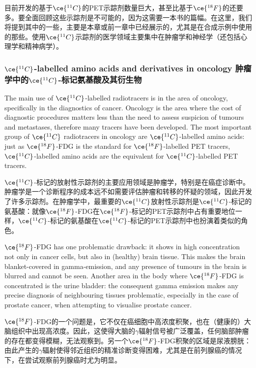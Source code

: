 \documentclass[dvipsnames, svgnames,a4paper,11pt]{article}
\begin{document}
目前开发的基于\(\ce{^{11}C}\)的PET示踪剂数量巨大，甚至比基于\(\ce{^{18}F}\)的还要多。要全面回顾这些示踪剂是不可能的，因为这需要一本书的篇幅。在这里，我们将提到其中的一些，主要是本章或前一章中已经展示的，尤其是在合成示例中使用的那些。使用\(\ce{^{11}C}\)示踪剂的医学领域主要集中在肿瘤学和神经学（还包括心理学和精神病学）。


\subsubsection{\(\ce{^{11}C}\)-labelled amino acids and derivatives in oncology 肿瘤学中的\(\ce{^{11}C}\)-标记氨基酸及其衍生物}  
The main use of \(\ce{^{11}C}\)-labelled radiotracers is in the area of oncology, specifically in the diagnostics of cancer. Oncology is the area where the cost of diagnostic procedures matters less than the need to assess suspicion of tumours and metastases, therefore many tracers have been developed. The most important group of \(\ce{^{11}C}\) radiotracers in oncology are \(\ce{^{11}C}\)-labelled amino acids: just as \(\ce{^{18}F}\)-FDG is the standard for \(\ce{^{18}F}\)-labelled PET tracers, \(\ce{^{11}C}\)-labelled amino acids are the equivalent for \(\ce{^{11}C}\)-labelled PET tracers.

\(\ce{^{11}C}\)-标记的放射性示踪剂的主要应用领域是肿瘤学，特别是在癌症诊断中。肿瘤学是一个诊断程序的成本远不如需要评估肿瘤和转移的怀疑的领域，因此开发了许多示踪剂。在肿瘤学中，最重要的\(\ce{^{11}C}\)放射性示踪剂是\(\ce{^{11}C}\)-标记的氨基酸：就像\(\ce{^{18}F}\)-FDG在\(\ce{^{18}F}\)-标记的PET示踪剂中占有重要地位一样，\(\ce{^{11}C}\)-标记的氨基酸在\(\ce{^{11}C}\)-标记的PET示踪剂中也扮演着类似的角色。

\(\ce{^{18}F}\)-FDG has one problematic drawback: it shows in high concentration not only in cancer cells, but also in (healthy) brain tissue. This makes the brain blanket-covered in gamma-emission, and any presence of tumours in the brain is blurred and cannot be seen. Another area in the body where \(\ce{^{18}F}\)-FDG is concentrated is the urine bladder: the consequent gamma emission makes any precise diagnosis of neighbouring tissues problematic, especially in the case of prostate cancer, when attempting to visualise prostate cancer.

\(\ce{^{18}F}\)-FDG的一个问题是，它不仅在癌细胞中高浓度积聚，也在（健康的）大脑组织中出现高浓度。因此，这使得大脑的$\gamma$辐射信号被广泛覆盖，任何脑部肿瘤的存在都变得模糊，无法观察到。另一个\(\ce{^{18}F}\)-FDG积聚的区域是尿液膀胱：由此产生的$\gamma$辐射使得邻近组织的精准诊断变得困难，尤其是在前列腺癌的情况下，在尝试观察前列腺癌时尤为明显。
\end{document}

